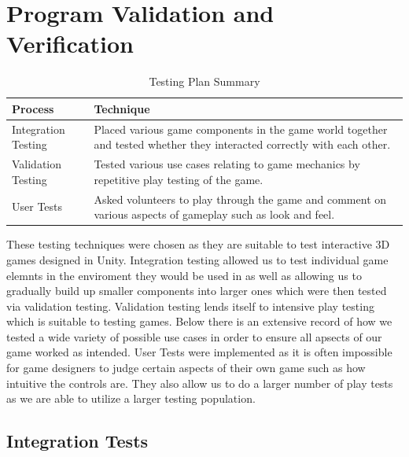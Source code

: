\documentclass[11pt,a4paper]{article}
\begin{document}
\section{Program Validation and Verification}

\begin{table}[H]
\caption{Testing Plan Summary}
	\begin{center}
		\begin{tabular}{ |l|p{10cm}| } 
			\hline
			Process & Technique \\ \hline
			Integration Testing & Placed various game components in the game world together and tested whether they interacted correctly with each other. \\ \hline
			Validation Testing & Tested various use cases relating to game mechanics by repetitive play testing of the game. \\ \hline
			User Tests & Asked volunteers to play through the game and comment on various aspects of gameplay such as look and feel.\\
			\hline
		\end{tabular}
	\end{center}
\end{table}
These testing techniques were chosen as they are suitable to test interactive 3D games designed in Unity. Integration testing allowed us to test individual game elemnts in the enviroment they would be used in as well as allowing us to gradually build up smaller components into larger ones which were then tested via validation testing. Validation testing lends itself to intensive play testing which is suitable to testing games. Below there is an extensive record of how we tested a wide variety of possible use cases in order to ensure all apsects of our game worked as intended. User Tests were implemented as it is often impossible for game designers to judge certain aspects of their own game such as how intuitive the controls are. They also allow us to do a larger number of play tests as we are able to utilize a larger testing population.


\subsection{Integration Tests}
\end{document}
